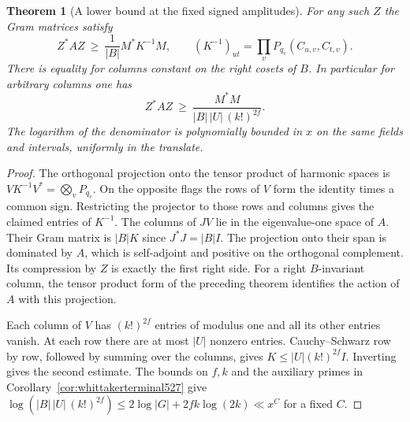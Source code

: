 \documentclass[a4paper,11pt]{article}
\newtheorem{theorem}[proposition]{Theorem}
\theoremstyle{definition}
\theoremstyle{remark}
\numberwithin{equation}{section}
\begin{document}
\begin{theorem}[A lower bound at the fixed signed amplitudes]
\leavevmode\label{thm:markedapartments528}
For any such \(Z\) the Gram matrices satisfy
\[
 Z^* A Z\ \ge\ \frac{1}{|B|} M^* K^{-1} M,\qquad
 (K^{-1})_{ut}=\prod_v P_{q_v}(C_{u,v},C_{t,v}).
\]
There is equality for columns constant on the right cosets of \(B\).
In particular for arbitrary columns one has
\[
 Z^* A Z\ \ge\ \frac{M^*M}{|B|\,|U|\,(k!)^{2f}} .
\]
The logarithm of the denominator is polynomially bounded in \(x\)
on the same fields and intervals, uniformly in the translate.
\end{theorem}
\begin{proof}
The orthogonal projection onto the tensor product of harmonic spaces
is \(V K^{-1}V^*=\bigotimes_v P_{q_v}\). On the opposite flags
the rows of \(V\) form the identity times a common sign.
Restricting the projector to those rows and columns gives the
claimed entries of \(K^{-1}\).
The columns of \(JV\) lie in the eigenvalue-one space of \(A\).
Their Gram matrix is \(|B|K\) since \(J^*J=|B|I\).
The projection onto their span is dominated by \(A\), which is
self-adjoint and positive on the orthogonal complement. Its
compression by \(Z\) is exactly the first right side.
For a right \(B\)-invariant column, the tensor product form of the
preceding theorem identifies the action of \(A\) with this projection.

Each column of \(V\) has \((k!)^{2f}\) entries of modulus one and
all its other entries vanish. At each row there are at most \(|U|\)
nonzero entries. Cauchy--Schwarz row by row, followed by summing
over the columns, gives \(K\le |U|(k!)^{2f}I\). Inverting gives
the second estimate. The bounds on \(f,k\) and the auxiliary primes
in Corollary~\ref{cor:whittakerterminal527} give
\(\log(|B|\,|U|\,(k!)^{2f})\le 2\log|G|+2fk\log(2k)\ll x^C\)
for a fixed \(C\).
\end{proof}
\end{document}
